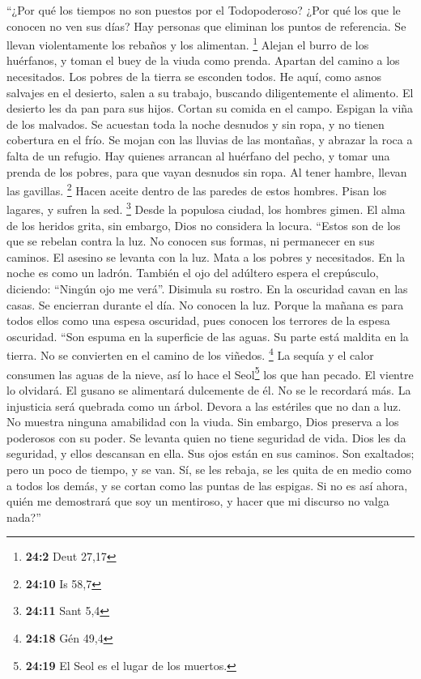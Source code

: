 \begin{paracol}{2}
 ``¿Por qué los tiempos no son puestos por el
Todopoderoso? ¿Por qué los que le conocen no ven sus días?
 Hay personas que eliminan los puntos de referencia. Se
llevan violentamente los rebaños y los alimentan. \footnote{\textbf{24:2}
  Deut 27,17}  Alejan el burro de los huérfanos, y toman
el buey de la viuda como prenda.  Apartan del camino a los
necesitados. Los pobres de la tierra se esconden todos. 
He aquí, como asnos salvajes en el desierto, salen a su trabajo,
buscando diligentemente el alimento. El desierto les da pan para sus
hijos.  Cortan su comida en el campo. Espigan la viña de
los malvados.  Se acuestan toda la noche desnudos y sin
ropa, y no tienen cobertura en el frío.  Se mojan con las
lluvias de las montañas, y abrazar la roca a falta de un refugio.
 Hay quienes arrancan al huérfano del pecho, y tomar una
prenda de los pobres,  para que vayan desnudos sin ropa.
Al tener hambre, llevan las gavillas. \footnote{\textbf{24:10} Is 58,7}
 Hacen aceite dentro de las paredes de estos hombres.
Pisan los lagares, y sufren la sed. \footnote{\textbf{24:11} Sant 5,4}
 Desde la populosa ciudad, los hombres gimen. El alma de
los heridos grita, sin embargo, Dios no considera la locura.
 ``Estos son de los que se rebelan contra la luz. No
conocen sus formas, ni permanecer en sus caminos.  El
asesino se levanta con la luz. Mata a los pobres y necesitados. En la
noche es como un ladrón.  También el ojo del adúltero
espera el crepúsculo, diciendo: ``Ningún ojo me verá''. Disimula su
rostro.  En la oscuridad cavan en las casas. Se encierran
durante el día. No conocen la luz.  Porque la mañana es
para todos ellos como una espesa oscuridad, pues conocen los terrores de
la espesa oscuridad.  ``Son espuma en la superficie de
las aguas. Su parte está maldita en la tierra. No se convierten en el
camino de los viñedos. \footnote{\textbf{24:18} Gén 49,4}
 La sequía y el calor consumen las aguas de la nieve, así
lo hace el Seol\footnote{\textbf{24:19} El Seol es el lugar de los
  muertos.} los que han pecado.  El vientre lo olvidará.
El gusano se alimentará dulcemente de él. No se le recordará más. La
injusticia será quebrada como un árbol.  Devora a las
estériles que no dan a luz. No muestra ninguna amabilidad con la viuda.
 Sin embargo, Dios preserva a los poderosos con su poder.
Se levanta quien no tiene seguridad de vida.  Dios les da
seguridad, y ellos descansan en ella. Sus ojos están en sus caminos.
 Son exaltados; pero un poco de tiempo, y se van. Sí, se
les rebaja, se les quita de en medio como a todos los demás, y se cortan
como las puntas de las espigas.  Si no es así ahora,
quién me demostrará que soy un mentiroso, y hacer que mi discurso no
valga nada?''


\end{paracol}
